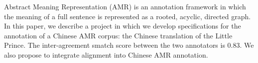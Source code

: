 Abstract Meaning Representation (AMR) is an annotation framework in which the meaning of a full sentence is represented as a rooted, acyclic, directed graph. In this paper, we describe a  project in which we develop specifications for the annotation of a Chinese AMR corpus: the Chinese translation of the Little Prince. The inter-agreement smatch score between the two annotators is 0.83. We also propose to integrate alignment into Chinese AMR annotation.
